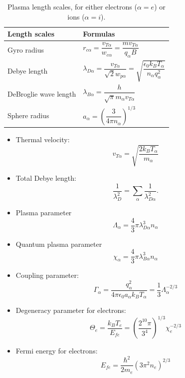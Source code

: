 \documentclass[oneside,a4paper,11pt]{report}
\begin{document}
\begin{table}[H]
\renewcommand{\arraystretch}{2.5}
\centering
\caption{Plasma length scales, for either electrons ($\alpha = e$) or ions ($\alpha = i$).}
\label{tb:plasma_length_scales}
 \begin{tabular}{l|l}
   Length scales & Formulas \\
   \hline
   Gyro radius  & $r_{c\alpha} = \dfrac{v_{T\alpha}}{w_{c\alpha}} = \dfrac{m v_{T\alpha}}{q_\alpha B}$ \\
   Debye length & $\lambda_{D\alpha} = \dfrac{v_{T\alpha}}{\sqrt{2} w_{p\alpha}} = \sqrt{ \dfrac{\epsilon_0 k_B T_\alpha}{ n_\alpha q_\alpha^2}}$ \\
   DeBroglie wave length & $\lambda_{B\alpha} = \dfrac{h}{\sqrt{\pi} m_\alpha v_{T\alpha}}$ \\
   Sphere radius & $a_\alpha = \left ( \dfrac{3}{4 \pi n_\alpha} \right )^{1/3}$
\end{tabular}
\end{table}

\begin{itemize}
\item Thermal velocity:
\begin{equation}
v_{T\alpha} = \sqrt{\frac{2 k_B T_\alpha}{m_\alpha}}
\end{equation}

\item Total Debye length:
\begin{equation}
    \frac{1}{\lambda_D^2} = \sum_\alpha \frac{1}{\lambda_{D\alpha}^2}.
\end{equation}

\item Plasma parameter
\begin{equation}
    \Lambda_\alpha = \frac{4}{3} \pi \lambda_{D\alpha}^3 n_\alpha
\end{equation}

\item Quantum plasma parameter
\begin{equation}
    \chi_\alpha = \frac{4}{3} \pi \lambda_{B\alpha}^3 n_\alpha
\end{equation}

\item Coupling parameter:
\begin{equation}
    \Gamma_\alpha = \frac{q_\alpha^2}{4 \pi \epsilon_0 a_\alpha k_B T_\alpha} = \frac{1}{3} \Lambda_\alpha^{-2/3}
\end{equation}

\item Degeneracy parameter for electrons:
\begin{equation}
    \Theta_e = \frac{k_B T_e}{E_{fe}} = \left( \frac{2^{10} \pi}{3^4} \right)^{1/3} \chi_e^{-2/3}
\end{equation}

\item Fermi energy for electrons:
\begin{equation}
    E_{fe} = \frac{\hbar^2}{2m_e} \left ( 3 \pi^2 n_e \right)^{2/3}
\end{equation}

\end{itemize}
\end{document}
